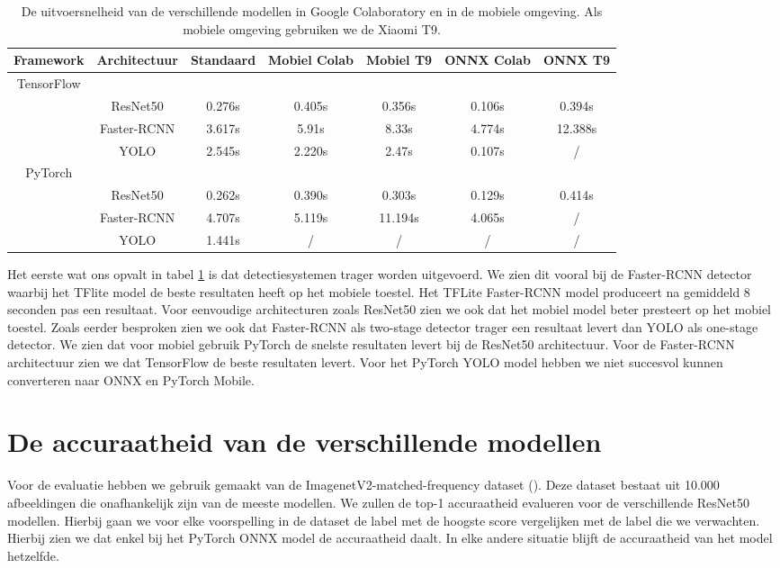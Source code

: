 \begin{table}[!ht]
    \caption{De uitvoersnelheid van de verschillende modellen in Google Colaboratory en in de mobiele omgeving. Als mobiele omgeving gebruiken we de Xiaomi T9.}
\begin{tabular}{ccccccc}
    \hline
    Framework & Architectuur & Standaard & Mobiel Colab & Mobiel T9 & ONNX Colab & ONNX T9\\
    \hline
    TensorFlow & & & & \\
     & ResNet50 & 0.276s & 0.405s & 0.356s & 0.106s & 0.394s \\
     & Faster-RCNN & 3.617s & 5.91s & 8.33s & 4.774s & 12.388s \\
     & YOLO & 2.545s & 2.220s & 2.47s & 0.107s & / \\
    PyTorch & & & & \\
    & ResNet50 & 0.262s & 0.390s & 0.303s & 0.129s & 0.414s \\
    & Faster-RCNN & 4.707s & 5.119s & 11.194s & 4.065s & / \\
    & YOLO & 1.441s & / & / & / & / \\
    \hline
\end{tabular}
\label{tab:speed}
\end{table}

Het eerste wat ons opvalt in tabel \ref{tab:speed} is dat detectiesystemen trager worden uitgevoerd.
We zien dit vooral bij de Faster-RCNN detector waarbij het TFlite model de beste resultaten heeft op het mobiele toestel.
Het TFLite Faster-RCNN model produceert na gemiddeld 8 seconden pas een resultaat.
Voor eenvoudige architecturen zoals ResNet50 zien we ook dat het mobiel model beter presteert op het mobiel toestel.
Zoals eerder besproken zien we ook dat Faster-RCNN als two-stage detector trager een resultaat levert dan YOLO als one-stage detector.
We zien dat voor mobiel gebruik PyTorch de snelste resultaten levert bij de ResNet50 architectuur.
Voor de Faster-RCNN architectuur zien we dat TensorFlow de beste resultaten levert.
Voor het PyTorch YOLO model hebben we niet succesvol kunnen converteren naar ONNX en PyTorch Mobile.

\section{De accuraatheid van de verschillende modellen}

Voor de evaluatie hebben we gebruik gemaakt van de ImagenetV2-matched-frequency dataset (\cite{recht2019imagenet}).
Deze dataset bestaat uit 10.000 afbeeldingen die onafhankelijk zijn van de meeste modellen.
We zullen de top-1 accuraatheid evalueren voor de verschillende ResNet50 modellen.
Hierbij gaan we voor elke voorspelling in de dataset de label met de hoogste score vergelijken met de label die we verwachten.
Hierbij zien we dat enkel bij het PyTorch ONNX model de accuraatheid daalt.
In elke andere situatie blijft de accuraatheid van het model hetzelfde.

